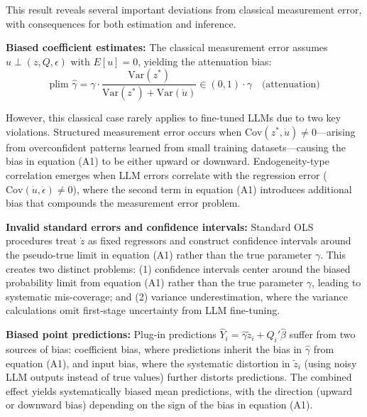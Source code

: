 \documentclass[11pt]{article}
\begin{document}
This result reveals several important deviations from classical measurement error, with consequences for both estimation and inference.

\textbf{Biased coefficient estimates:} The classical measurement error assumes $u \perp (z, Q, \epsilon)$ with $E[u] = 0$,
yielding the attenuation bias:
\begin{equation}
\text{plim } \hat{\gamma} = \gamma \cdot \frac{\text{Var}(z^*)}{\text{Var}(z^*) + \text{Var}(\dot{u})} \in (0,1) \cdot \gamma \quad \text{(attenuation)} \tag{A2}
\end{equation}

However, this classical case rarely applies to fine-tuned LLMs due to two key violations. 
Structured measurement error occurs when $\text{Cov}(z^*, \dot{u}) \neq 0$—arising from overconfident 
patterns learned from small training datasets—causing the bias in equation (A1) to be either upward or downward. 
Endogeneity-type correlation emerges when LLM errors correlate with the regression error ($\text{Cov}(\dot{u}, \dot{\epsilon}) \neq 0$), 
where the second term in equation (A1) introduces additional bias that compounds the measurement error problem.

\textbf{Invalid standard errors and confidence intervals:} Standard OLS procedures treat $\dot{z}$ as fixed regressors and construct confidence intervals 
around the pseudo-true limit in equation (A1) rather than the true parameter $\gamma$. 
This creates two distinct problems: (1) confidence intervals center around the biased probability limit from equation (A1)
rather than the true parameter $\gamma$, leading to systematic mis-coverage; and (2) variance underestimation,
where the variance calculations omit first-stage uncertainty from LLM fine-tuning.

\textbf{Biased point predictions:} Plug-in predictions $\hat{Y}_i = \hat{\gamma} \tilde{z}_i + Q_i'\hat{\beta}$ 
suffer from two sources of bias: coefficient bias, where predictions inherit the bias in $\hat{\gamma}$ from equation (A1),
and input bias, where the systematic distortion in $\tilde{z}_i$
(using noisy LLM outputs instead of true values) further distorts predictions. 
The combined effect yields systematically biased mean predictions, with the direction (upward or downward bias)
depending on the sign of the bias in equation (A1).
\end{document}
